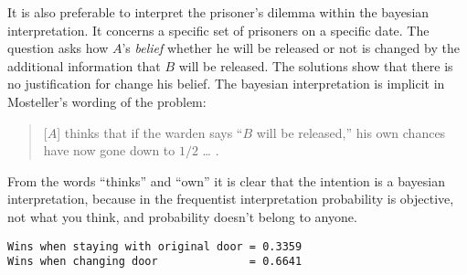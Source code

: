 It is also preferable to interpret the prisoner's dilemma within the bayesian interpretation. It concerns a specific set of prisoners on a specific date. The question asks how $A$'s \textit{belief} whether he will be released or not is changed by the additional information that $B$ will be released. The solutions show that there is no justification for change his belief. The bayesian interpretation is implicit in Mosteller's wording of the problem:
\begin{quote}
[$A$] thinks that if the warden says ``$B$ will be released,'' his own chances have now gone down to $1/2$ \ldots{} \cite[p.~4]{fifty}.
\end{quote}
From the words ``thinks'' and ``own'' it is clear that the intention is a bayesian interpretation, because in the frequentist interpretation probability is objective, not what you think, and probability doesn't belong to anyone.

\medskip

\sml{}

\begin{verbatim}
Wins when staying with original door = 0.3359
Wins when changing door              = 0.6641
\end{verbatim}

